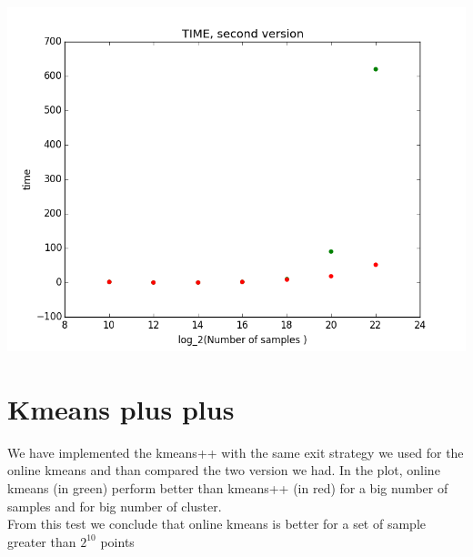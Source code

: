 \documentclass[12pt]{article}
\begin{document}
\begin{table}
\includegraphics[scale=0.4]{time_secondVersion.png}
  \end{table}
  
  
  \newpage
\section{Kmeans plus plus}
We have implemented the kmeans++ with the same exit strategy we used for the online kmeans and than compared the two version we had. In the plot, online kmeans (in green) perform better than kmeans++ (in red) for a big number of samples and for big number of cluster. \\
From this test we conclude that online kmeans is better for a set of sample greater than $2^10$ points

  
  
\end{document}
